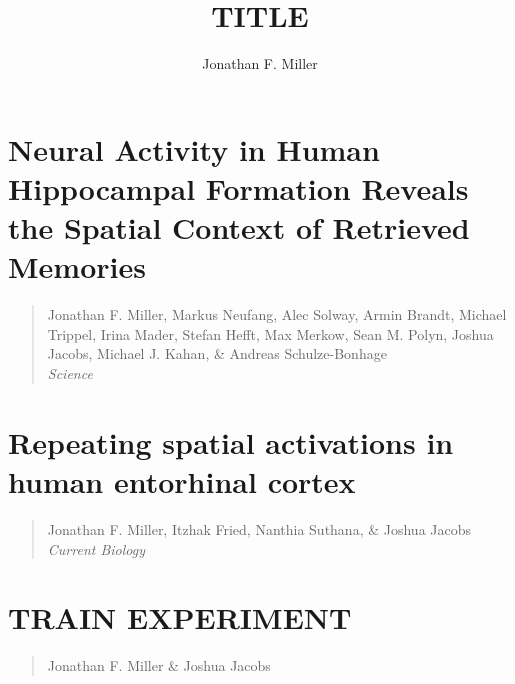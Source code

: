 \documentclass[final,subfig,blackref,approvalform]{drexel-thesis} %
\author{Jonathan F. Miller}
\title{TITLE}
\begin{document}


\begin{thesis}
  
    

    \chapter{Neural Activity in Human Hippocampal Formation Reveals the Spatial Context of Retrieved Memories}
    \begin{quotation}
    \singlespacing
    \noindent Jonathan F. Miller, Markus Neufang, Alec Solway, Armin Brandt, Michael Trippel, Irina Mader, Stefan Hefft, Max Merkow, Sean M.  Polyn, Joshua Jacobs, Michael J. Kahan, \& Andreas Schulze-Bonhage  \\ \textit{Science}
    \end{quotation}
    

    \chapter{Repeating spatial activations in human entorhinal cortex}
    \begin{quotation}
    \singlespacing
    \noindent Jonathan F. Miller, Itzhak Fried, Nanthia Suthana, \& Joshua Jacobs \\ \textit{Current Biology}
    \end{quotation}
    
	
    \chapter{TRAIN EXPERIMENT}
    \begin{quotation}
    \singlespacing
    \noindent Jonathan F. Miller \& Joshua Jacobs \\
    \end{quotation}	


  
\end{thesis}

 


% 
% 
\end{document}
